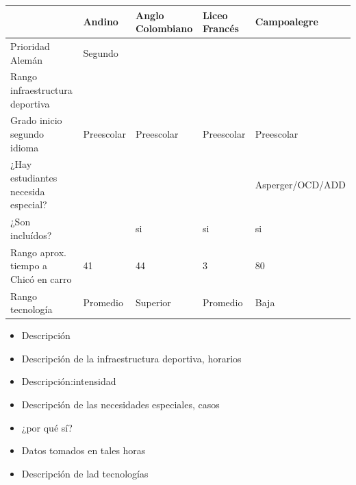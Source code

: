 \documentclass[letterpaper, 12pt]{book}\usepackage[]{graphicx}\usepackage[]{color}
\begin{document}
\begin{table}[ht]
\centering
\begin{tabular}{C{1in}C{1in}C{1in}C{1in}C{1in}}
  \hline
 & Andino & Anglo Colombiano & Liceo Francés & Campoalegre \\ 
  \hline
Prioridad Alemán & Segundo &  &  &  \\ 
  Rango infraestructura deportiva &  &  &  &  \\ 
  Grado inicio segundo idioma & Preescolar & Preescolar & Preescolar & Preescolar \\ 
  ¿Hay estudiantes necesida especial? &  &  &  & Asperger/OCD/ADD \\ 
  ¿Son incluídos? &  & si & si & si \\ 
  Rango aprox. tiempo a Chicó en carro & 41 & 44 &  3 & 80 \\ 
  Rango tecnología & Promedio & Superior & Promedio & Baja \\ 
   \hline
\end{tabular}
\end{table}


\vspace{0.5cm}

\begin{itemize}
\item Descripción
\item Descripción de la infraestructura deportiva, horarios
\item Descripción:intensidad
\item Descripción de las necesidades especiales, casos
\item ¿por qué sí?
\item Datos tomados en tales horas
\item Descripción de lad tecnologías
\end{itemize}
\newpage

\ClearShipoutPicture

\end{document}
